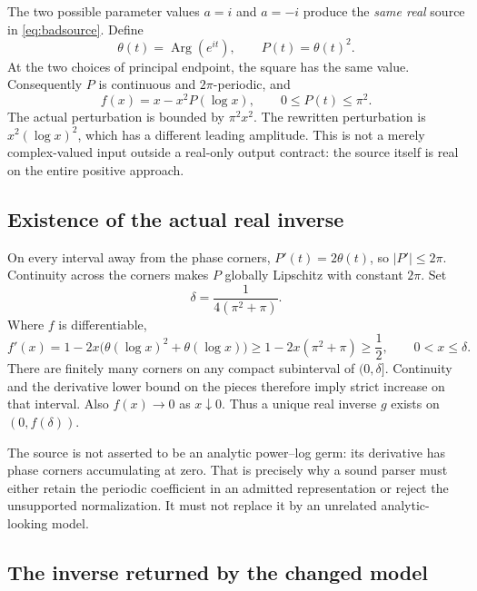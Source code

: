 \documentclass[11pt,a4paper]{article}
\begin{document}
The two possible parameter values $a=i$ and $a=-i$ produce the \emph{same real}
source in \eqref{eq:badsource}. Define
\begin{equation}\label{eq:periodicP}
 \theta(t)=\operatorname{Arg}(e^{it}),\qquad
 P(t)=\theta(t)^2.
\end{equation}
At the two choices of principal endpoint, the square has the same value.
Consequently $P$ is continuous and $2\pi$-periodic, and
\begin{equation}\label{eq:realF}
 f(x)=x-x^2P(\log x),\qquad 0\le P(t)\le\pi^2.
\end{equation}
The actual perturbation is bounded by $\pi^2x^2$. The rewritten perturbation is
$x^2(\log x)^2$, which has a different leading amplitude. This is not a merely
complex-valued input outside a real-only output contract: the source itself is
real on the entire positive approach.

\subsection{Existence of the actual real inverse}

On every interval away from the phase corners,
$P'(t)=2\theta(t)$, so $|P'|\le2\pi$. Continuity across the corners makes $P$
globally Lipschitz with constant $2\pi$. Set
\begin{equation}\label{eq:delta}
 \delta=\frac{1}{4(\pi^2+\pi)}.
\end{equation}
Where $f$ is differentiable,
\[
 f'(x)=1-2x\bigl(\theta(\log x)^2+\theta(\log x)\bigr)
 \ge 1-2x(\pi^2+\pi)\ge\frac12,
 \qquad 0<x\le\delta.
\]
There are finitely many corners on any compact subinterval of $(0,\delta]$.
Continuity and the derivative lower bound on the pieces therefore imply strict
increase on that interval. Also $f(x)\to0$ as $x\downarrow0$.
Thus a unique real inverse $g$ exists on $(0,f(\delta))$.

The source is not asserted to be an analytic power--log germ: its derivative
has phase corners accumulating at zero. That is precisely why a sound parser
must either retain the periodic coefficient in an admitted representation or
reject the unsupported normalization. It must not replace it by an unrelated
analytic-looking model.

\subsection{The inverse returned by the changed model}
\end{document}

